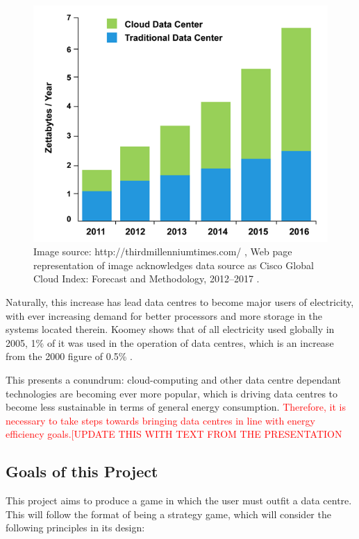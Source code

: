\begin{figure}[H]
\centering
\includegraphics[width=5in]{Resources//1.png}
\caption{Image source: http://thirdmillenniumtimes.com/ \cite{ThirdMilleniumTimesInternetIsStillGrowingFast}, Web page representation of image acknowledges data source as Cisco Global Cloud Index: Forecast and Methodology, 2012–2017 \cite{CiscoGlobalCloudIndex:ForecastAndMethodology}.}
\label{fig:ThirdMilleniumTimesBarGraph}
\end{figure}

Naturally, this increase has lead \gls{data centre}s to become major users of electricity, with ever increasing demand for better processors and more storage in the systems located therein. Koomey shows that of all electricity used globally in 2005, 1\% of it was used in the operation of \gls{data centre}s, which is an increase from the 2000 figure of 0.5\% \cite{KoomeyGrowthInDataCenterElectricityUse}.

This presents a conundrum: cloud-computing and other \gls{data centre} dependant technologies are becoming ever more popular, which is driving \gls{data centre}s to become less sustainable in terms of general energy consumption. \textcolor{red}{Therefore, it is necessary to take steps towards bringing \gls{data centre}s in line with energy efficiency goals.[UPDATE THIS WITH TEXT FROM THE PRESENTATION}

\subsection{Goals of this Project}
\label{sec:Background:GoalsOfThisProject}
This project aims to produce a game in which the user must outfit a data centre. This will follow the format of being a strategy game, which will consider the following principles in its design:

